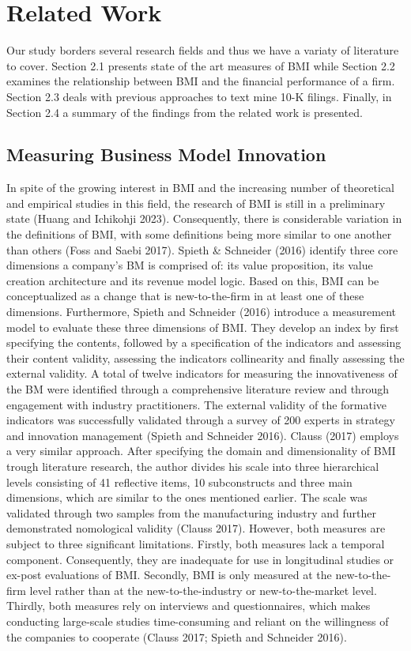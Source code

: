 \documentclass[
]{article}
\begin{document}
\section{Related Work}\label{related-work}

Our study borders several research fields and thus we have a variaty of
literature to cover. Section 2.1 presents state of the art measures of
BMI while Section 2.2 examines the relationship between BMI and the
financial performance of a firm. Section 2.3 deals with previous
approaches to text mine 10-K filings. Finally, in Section 2.4 a summary
of the findings from the related work is presented.

\subsection{Measuring Business Model
Innovation}\label{measuring-business-model-innovation}

In spite of the growing interest in BMI and the increasing number of
theoretical and empirical studies in this field, the research of BMI is
still in a preliminary state (Huang and Ichikohji 2023). Consequently,
there is considerable variation in the definitions of BMI, with some
definitions being more similar to one another than others (Foss and
Saebi 2017). Spieth \& Schneider (2016) identify three core dimensions a
company's BM is comprised of: its value proposition, its value creation
architecture and its revenue model logic. Based on this, BMI can be
conceptualized as a change that is new-to-the-firm in at least one of
these dimensions. Furthermore, Spieth and Schneider (2016) introduce a
measurement model to evaluate these three dimensions of BMI. They
develop an index by first specifying the contents, followed by a
specification of the indicators and assessing their content validity,
assessing the indicators collinearity and finally assessing the external
validity. A total of twelve indicators for measuring the innovativeness
of the BM were identified through a comprehensive literature review and
through engagement with industry practitioners. The external validity of
the formative indicators was successfully validated through a survey of
200 experts in strategy and innovation management (Spieth and Schneider
2016). Clauss (2017) employs a very similar approach. After specifying
the domain and dimensionality of BMI trough literature research, the
author divides his scale into three hierarchical levels consisting of 41
reflective items, 10 subconstructs and three main dimensions, which are
similar to the ones mentioned earlier. The scale was validated through
two samples from the manufacturing industry and further demonstrated
nomological validity (Clauss 2017). However, both measures are subject
to three significant limitations. Firstly, both measures lack a temporal
component. Consequently, they are inadequate for use in longitudinal
studies or ex-post evaluations of BMI. Secondly, BMI is only measured at
the new-to-the-firm level rather than at the new-to-the-industry or
new-to-the-market level. Thirdly, both measures rely on interviews and
questionnaires, which makes conducting large-scale studies
time-consuming and reliant on the willingness of the companies to
cooperate (Clauss 2017; Spieth and Schneider 2016).
\end{document}
